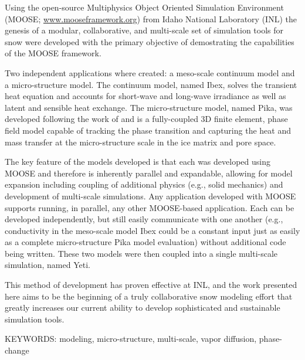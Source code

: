 Using the open-source Multiphysics Object Oriented Simulation Environment (MOOSE; \url{www.mooseframework.org}) from Idaho National Laboratory (INL) the genesis of a modular, collaborative, and multi-scale set of simulation tools for snow were developed with the primary objective of demostrating the capabilities of the MOOSE framework.

Two independent applications where created: a meso-scale continuum model and a micro-structure model. The continuum model, named Ibex, solves the transient heat equation and accounts for short-wave and long-wave irradiance as well as latent and sensible heat exchange. The micro-structure model, named Pika, was developed following the work of \citet{kaempfer2009phase} and is a fully-coupled 3D finite element, phase field model capable of tracking the phase transition and capturing the heat and mass transfer at the micro-structure scale in the ice matrix and pore space.

The key feature of the models developed is that each was developed using MOOSE and therefore is inherently parallel and expandable, allowing for model expansion including coupling of additional physics (e.g., solid mechanics) and development of multi-scale simulations. Any application developed with MOOSE supports running, in parallel, any other MOOSE-based application. Each can be developed independently, but still easily communicate with one another (e.g., conductivity in the meso-scale model Ibex could be a constant input just as easily as a complete micro-structure Pika model evaluation) without additional code being written.  These two models were then coupled into a single multi-scale simulation, named Yeti.

This method of development has proven effective at INL, and the work presented here aims to be the beginning of a truly collaborative snow modeling effort that greatly increases our current ability to develop sophisticated and sustainable simulation tools.

\bigskip
\noindent KEYWORDS: modeling, micro-structure, multi-scale, vapor diffusion, phase-change
